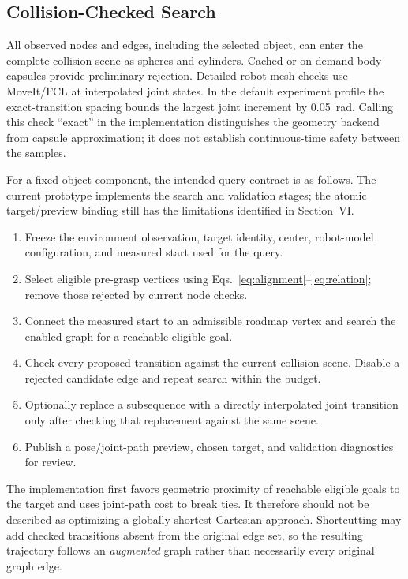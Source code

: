 \documentclass[letterpaper,10pt,conference]{ieeeconf}
\begin{document}
\subsection{Collision-Checked Search}
All observed nodes and edges, including the selected object, can enter the complete collision scene as spheres and cylinders. Cached or on-demand body capsules provide preliminary rejection. Detailed robot-mesh checks use MoveIt/FCL at interpolated joint states. In the default experiment profile the exact-transition spacing bounds the largest joint increment by 0.05~rad. Calling this check ``exact'' in the implementation distinguishes the geometry backend from capsule approximation; it does not establish continuous-time safety between the samples.

For a fixed object component, the intended query contract is as follows. The current prototype implements the search and validation stages; the atomic target/preview binding still has the limitations identified in Section~VI.
\begin{enumerate}
\item Freeze the environment observation, target identity, center, robot-model configuration, and measured start used for the query.
\item Select eligible pre-grasp vertices using Eqs.~\eqref{eq:alignment}--\eqref{eq:relation}; remove those rejected by current node checks.
\item Connect the measured start to an admissible roadmap vertex and search the enabled graph for a reachable eligible goal.
\item Check every proposed transition against the current collision scene. Disable a rejected candidate edge and repeat search within the budget.
\item Optionally replace a subsequence with a directly interpolated joint transition only after checking that replacement against the same scene.
\item Publish a pose/joint-path preview, chosen target, and validation diagnostics for review.
\end{enumerate}
The implementation first favors geometric proximity of reachable eligible goals to the target and uses joint-path cost to break ties. It therefore should not be described as optimizing a globally shortest Cartesian approach. Shortcutting may add checked transitions absent from the original edge set, so the resulting trajectory follows an \emph{augmented} graph rather than necessarily every original graph edge.
\end{document}
